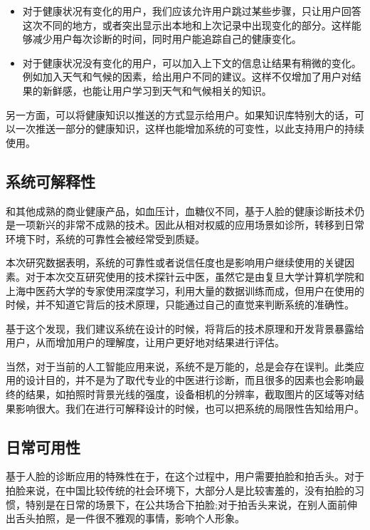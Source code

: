 \begin{itemize}

    \item 对于健康状况有变化的用户，我们应该允许用户跳过某些步骤，只让用户回答这次不同的地方，或者突出显示出本地和上次记录中出现变化的部分。这样能够减少用户每次诊断的时间，同时用户能追踪自己的健康变化。

    \item 对于健康状况没有变化的用户，可以加入上下文的信息让结果有稍微的变化。例如加入天气和气候的因素，给出用户不同的建议。这样不仅增加了用户对结果的新鲜感，也能让用户学习到天气和气候相关的知识。

\end{itemize}

另一方面，可以将健康知识以推送的方式显示给用户。如果知识库特别大的话，可以一次推送一部分的健康知识，这样也能增加系统的可变性，以此支持用户的持续使用。

\subsection{系统可解释性}

和其他成熟的商业健康产品，如血压计，血糖仪不同，基于人脸的健康诊断技术仍是一项新兴的非常不成熟的技术。因此从相对权威的应用场景如诊所，转移到日常环境下时，系统的可靠性会被经常受到质疑。

本次研究数据表明，系统的可靠性或者说信任度也是影响用户继续使用的关键因素。对于本次交互研究使用的技术探针云中医，虽然它是由复旦大学计算机学院和上海中医药大学的专家使用深度学习，利用大量的数据训练而成，但用户在使用的时候，并不知道它背后的技术原理，只能通过自己的直觉来判断系统的准确性。

基于这个发现，我们建议系统在设计的时候，将背后的技术原理和开发背景暴露给用户，从而增加用户的理解度，让用户更好地对结果进行评估。

当然，对于当前的人工智能应用来说，系统不是万能的，总是会存在误判。此类应用的设计目的，并不是为了取代专业的中医进行诊断，而且很多的因素也会影响最终的结果，如拍照时背景光线的强度，设备相机的分辨率，截取图片的区域等对结果影响很大。我们在进行可解释设计的时候，也可以把系统的局限性告知给用户。

\subsection{日常可用性}
基于人脸的诊断应用的特殊性在于，在这个过程中，用户需要拍脸和拍舌头。对于拍脸来说，在中国比较传统的社会环境下，大部分人是比较害羞的，没有拍脸的习惯，特别是在日常的场景下，在公共场合下拍脸;对于拍舌头来说，在别人面前伸出舌头拍照，是一件很不雅观的事情，影响个人形象。

